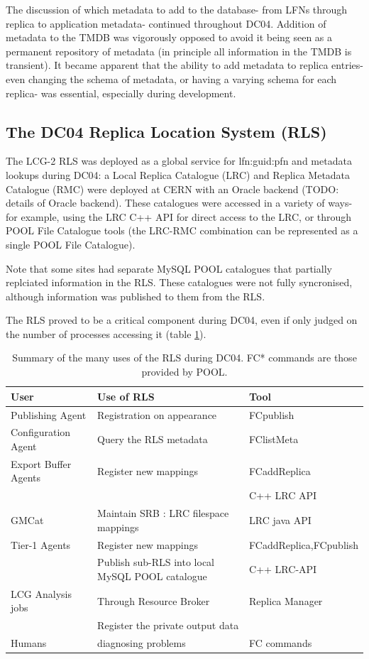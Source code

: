 \documentclass{cmspaper}
\begin{document}
The discussion of which metadata to add to the database- from LFNs through replica to application metadata- continued throughout DC04. Addition of metadata to the TMDB was vigorously opposed to avoid it being seen as a permanent repository of metadata (in principle all information in the TMDB is transient). It became apparent that the ability to add metadata to replica entries- even changing the schema of metadata, or having a varying schema for each replica- was essential, especially during development.

\subsection{The DC04 Replica Location System (RLS)}
The LCG-2 RLS was deployed as a global service for lfn:guid:pfn and metadata lookups during DC04: a Local Replica Catalogue (LRC) and Replica Metadata Catalogue (RMC) were deployed at CERN with an Oracle backend (TODO: details of Oracle backend). These catalogues were accessed in a variety of ways- for example, using the LRC C++ API for direct access to the LRC, or through POOL File Catalogue tools (the LRC-RMC combination can be represented as a single POOL File Catalogue).

Note that some sites had separate MySQL POOL catalogues that partially replciated information in the RLS. These catalogues were not fully syncronised, although information was published to them from the RLS.

The RLS proved to be a critical component during DC04, even if only judged on the number of processes accessing it (table \ref{table:rls}).

\begin{table}
\begin{tabular}[tbp]{|l|l|l|}
\hline User & Use of RLS & Tool
\\ \hline Publishing Agent & Registration on appearance & FCpublish
\\ Configuration Agent & Query the RLS metadata & FClistMeta
\\ Export Buffer Agents & Register new mappings & FCaddReplica
\\ & & C++ LRC API
\\ GMCat & Maintain SRB : LRC filespace mappings & LRC java API
\\ Tier-1 Agents & Register new mappings & FCaddReplica,FCpublish
\\ & Publish sub-RLS into local MySQL POOL catalogue & C++ LRC-API
\\ LCG Analysis jobs & Through Resource Broker & Replica Manager
\\ & Register the private output data & 
\\ Humans & diagnosing problems & FC commands
\\ \hline
\end{tabular}
\label{table:rls}
\caption{Summary of the many uses of the RLS during DC04. FC* commands are those provided by POOL.}
\end{table}
\end{document}
